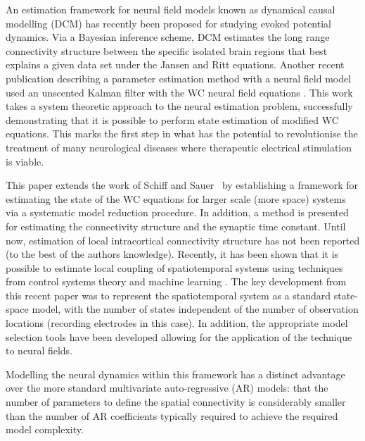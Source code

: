 \documentclass[twocolumn,11pt,a4paper]{article}		%
\begin{document}
An estimation framework for neural field models known as dynamical causal modelling (DCM) \cite{David2003,David2006} has recently been proposed for studying evoked potential dynamics. Via a Bayesian inference scheme, DCM estimates the long range connectivity structure between the specific isolated brain regions that best explains a given data set under the Jansen and Ritt equations. Another recent publication describing a parameter estimation method with a neural field model used an unscented Kalman filter with the WC neural field equations \cite{schiff2008kalman}. This work takes a system theoretic approach to the neural estimation problem, successfully demonstrating that it is possible to perform state estimation of modified WC equations. This marks the first step in what has the potential to revolutionise the treatment of many neurological diseases where therapeutic electrical stimulation is viable.


This paper extends the work of Schiff and Sauer~\cite{schiff2008kalman} by establishing a framework for estimating the state of the WC equations for larger scale (more space) systems via a systematic model reduction procedure. In addition, a method is presented for estimating the connectivity structure and the synaptic time constant. Until now, estimation of local intracortical connectivity structure has not been reported (to the best of the authors knowledge). Recently, it has been shown that it is possible to estimate local coupling of spatiotemporal systems using techniques from control systems theory and machine learning \cite{Dewar2009}. The key development from this recent paper was to represent the spatiotemporal system as a standard state-space model, with the number of states independent of the number of observation locations (recording electrodes in this case). In addition, the appropriate model selection tools have been developed \cite{Scerri2009} allowing for the application of the technique to neural fields. 

Modelling the neural dynamics within this framework has a distinct advantage over the more standard multivariate auto-regressive (AR) models: that the number of parameters to define the spatial connectivity is considerably smaller than the number of AR coefficients typically required to achieve the required model complexity. 
\end{document}
